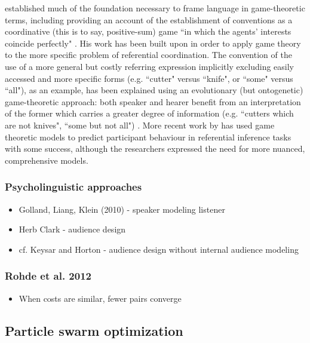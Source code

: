 \documentclass[12pt,a4paper]{article}
\begin{document}
\cite{lewis1969} established much of the foundation necessary to frame language in game-theoretic terms, including providing an account of the establishment of conventions as a coordinative (this is to say, positive-sum) game ``in which the agents' interests coincide perfectly" \citep[p.~14]{lewis1969}.
His work has been built upon in order to apply game theory to the more specific problem of referential coordination. The convention of the use of a more general but costly referring expression implicitly excluding easily accessed and more specific forms (e.g. ``cutter" versus ``knife", or ``some" versus ``all"), as an example, has been explained using an evolutionary (but ontogenetic) game-theoretic approach: both speaker and hearer benefit from an interpretation of the former which carries a greater degree of information (e.g. ``cutters which are not knives", ``some but not all") \citep{benz2005}. More recent work by \cite{degen2012} has used game theoretic models to predict participant behaviour in referential inference tasks with some success, although the researchers expressed the need for more nuanced, comprehensive models. 

\subsubsection{Psycholinguistic approaches}
\begin{itemize}
\item Golland, Liang, Klein (2010) - speaker modeling listener
\item Herb Clark - audience design
\item cf. Keysar and Horton - audience design without internal audience modeling
\end{itemize}
\subsubsection{Rohde et al. 2012}
\begin{itemize}
\item When costs are similar, fewer pairs converge
\end{itemize}


\subsection{Particle swarm optimization}
\end{document}
